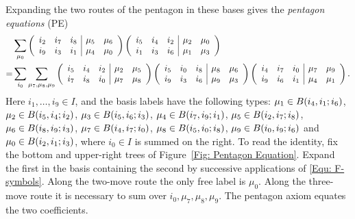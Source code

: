 \documentclass{amsart}
\begin{document}
Expanding the two routes of the pentagon in these bases gives the \emph{pentagon equations} (PE)
\begin{align}\label{Equ: Pentagon Equation}
&
\sum_{\mu_0} \left(
\begin{array}{ccc | cc}
i_2& i_7 & i_8 & \mu_5 & \mu_6 \\
i_9& i_3 & i_1 & \mu_4 & \mu_0
\end{array}
\right)
\left(
\begin{array}{ccc | cc}
i_5& i_4 & i_2 & \mu_2 & \mu_0 \\
i_1& i_3 & i_6 & \mu_1 & \mu_3
\end{array}
\right)
\\* \nonumber
=&
\sum_{i_0}
\sum_{\mu_7,\mu_8,\mu_9}
\left(
\begin{array}{ccc | cc}
i_5& i_4 & i_2 & \mu_2 & \mu_5 \\
i_7& i_8 & i_0 & \mu_7 & \mu_8
\end{array}
\right)
\left(
\begin{array}{ccc | cc}
i_5& i_0 & i_8 & \mu_8 & \mu_6 \\
i_9& i_3 & i_6 & \mu_9 & \mu_3
\end{array}
\right)
\left(
\begin{array}{ccc | cc}
i_4& i_7 & i_0 & \mu_7 & \mu_9 \\
i_9& i_6 & i_1 & \mu_4 & \mu_1
\end{array}
\right).
\end{align}
Here $i_1,\ldots,i_9\in I$, and the basis labels have the following types:
$\mu_1 \in B(i_4,i_1;i_6)$, $\mu_2 \in B(i_5,i_4;i_2)$, $\mu_3 \in B(i_5,i_6;i_3)$, $\mu_4 \in B(i_7,i_9;i_1)$,  $\mu_5 \in B(i_2,i_7;i_8)$, $\mu_6 \in B(i_8,i_9;i_3)$,  $\mu_7 \in B(i_4,i_7;i_0)$,  $\mu_8 \in B(i_5,i_0;i_8)$,  $\mu_9 \in B(i_0,i_9;i_6)$ and $\mu_0 \in B(i_2,i_1;i_3)$,
where $i_0\in I$ is summed on the right. To read the identity, fix the bottom and upper-right trees of Figure~\ref{Fig: Pentagon Equation}. Expand the first in the basis containing the second by successive applications of \eqref{Equ: F-symbols}. Along the two-move route the only free label is $\mu_0$. Along the three-move route it is necessary to sum over $i_0,\mu_7,\mu_8,\mu_9$. The pentagon axiom equates the two coefficients.
\end{document}
